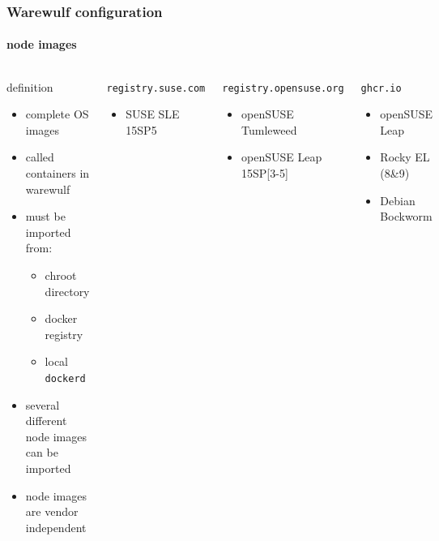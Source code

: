 \documentclass[aspectratio=169]{beamer}
\begin{document}
\begin{frame}[fragile]
\frametitle{Warewulf configuration}
\framesubtitle{node images}
\begin{columns}
\begin{block}{definition}
\begin{itemize}
  \item complete OS images
  \item called containers in warewulf
  \item must be imported from:
  \begin{itemize}
    \item chroot directory
    \item docker registry
    \item local \texttt{dockerd}
  \end{itemize}
  \item several different node images can be imported
  \item node images are vendor independent
\end{itemize}
\end{block}
\begin{block}{\texttt{registry.suse.com}}
  \begin{itemize}
    \item SUSE SLE 15SP5
  \end{itemize}
\end{block}
\begin{block}{\texttt{registry.opensuse.org}}
  \begin{itemize}
    \item openSUSE Tumleweed
    \item openSUSE Leap 15SP[3-5]
   \end{itemize}
\end{block}
\begin{block}{\texttt{ghcr.io}}
  \begin{itemize}
    \item openSUSE Leap
    \item Rocky EL (8\&9)
    \item Debian Bockworm
  \end{itemize}
\end{block}
\end{columns}
\end{frame}
\end{document}

